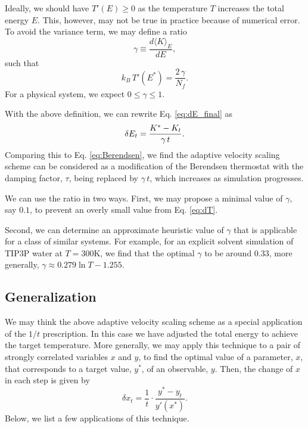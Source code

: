 \documentclass[reprint]{revtex4-1}
\begin{document}
Ideally, we should have $T'(E) \ge 0$
as the temperature $T$ increases the total energy $E$.
%
This, however, may not be true in practice
because of numerical error.
%
%
To avoid the variance term,
we may define a ratio
%
\begin{equation}
  \gamma
  \equiv
  \frac
  {
    d \langle K \rangle_E
  }
  {
    dE
  }
  ,
  \label{eq:gamma_def}
\end{equation}
%
such that
%
\begin{equation}
  k_B \, T'(E^*)
  =
  \frac{ 2 \, \gamma } { N_f }
  .
  \label{eq:dT_approx}
\end{equation}
%
For a physical system, we expect $0 \le \gamma \le 1$.
%

With the above definition, we can rewrite Eq. \eqref{eq:dE_final} as
%
\begin{equation}
  \delta E_t
  =
  \frac{ K^* - K_t } { \gamma \, t }
  .
  \notag
\end{equation}
%
Comparing this to Eq. \eqref{eq:Berendsen},
we find the adaptive velocity scaling scheme
can be considered as a modification of the Berendsen thermostat
with the damping factor, $\tau$, being replaced by $\gamma \, t$,
which increases as simulation progresses.


We can use the ratio in two ways.
%
First, we may propose a minimal value of $\gamma$, say $0.1$,
to prevent an overly small value from Eq. \eqref{eq:dT}.

Second,
we can determine an approximate heuristic value of $\gamma$
that is applicable for a class of similar systems.
%
For example,
for an explicit solvent simulation of TIP3P water\cite{jorgensen1983}
at $T = 300\mathrm K$, we find that the optimal $\gamma$
to be around $0.33$,
more generally, $\gamma \approx 0.279\ln T - 1.255$.


\subsection{Generalization}


We may think the above adaptive velocity scaling scheme
as a special application of the $1/t$ prescription.
%
In this case we have adjusted the total energy
to achieve the target temperature.
%
More generally, we may apply this technique
to a pair of strongly correlated variables $x$ and $y$,
to find the optimal value of a parameter, $x$,
that corresponds to a target value, $y^*$, of an observable, $y$.
%
Then, the change of $x$ in each step is given by
\begin{equation}
  \delta x_t = \frac 1 t
  \cdot
  \frac{ y^* - y_t }
       { y'(x^*) }
  .
  \label{eq:adjustxy}
\end{equation}
%
Below, we list a few applications of this technique.
\end{document}
